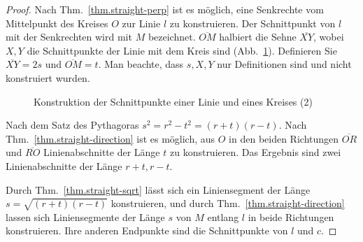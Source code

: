 \begin{proof}
Nach Thm.~\ref{thm.straight-perp} ist es möglich, eine Senkrechte vom Mittelpunkt des Kreises $O$ zur Linie $l$ zu konstruieren. Der Schnittpunkt von $l$ mit der Senkrechten wird mit $M$ bezeichnet. $\overline{OM}$ halbiert die Sehne $\overline{XY}$, wobei $X, Y$ die Schnittpunkte der Linie mit dem Kreis sind (Abb.~\ref{f.se-line-circle2}). Definieren Sie $\overline{XY}=2s$ und $\overline{OM}=t$. Man beachte, dass $s,X,Y$ nur Definitionen sind und nicht konstruiert wurden.
\begin{figure}[b]
\begin{center}
\end{center}
\caption{Konstruktion der Schnittpunkte einer Linie und eines Kreises (2)}\label{f.se-line-circle2}
\end{figure}

Nach dem Satz des Pythagoras $s^2=r^2-t^2=(r+t)(r-t)$. Nach Thm.~\ref{thm.straight-direction} ist es möglich, aus $O$ in den beiden Richtungen $\overline{OR}$ und $\overline{RO}$ Linienabschnitte der Länge $t$ zu konstruieren. Das Ergebnis sind zwei Linienabschnitte der Länge $r+t,r-t$.

Durch Thm.~\ref{thm.straight-sqrt} lässt sich ein Liniensegment der Länge $s=\sqrt{(r+t)(r-t)}$ konstruieren, und durch Thm.~\ref{thm.straight-direction} lassen sich Liniensegmente der Länge $s$ von $M$ entlang $l$ in beide Richtungen konstruieren. Ihre anderen Endpunkte sind die Schnittpunkte von $l$ und $c$.
\end{proof}

